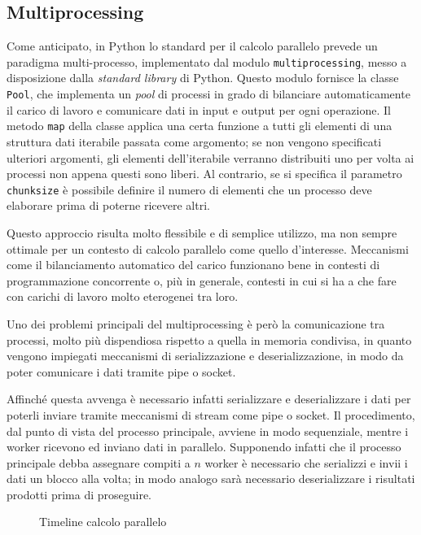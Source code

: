 \subsection{Multiprocessing}\label{ssec: parallel_mp}

Come anticipato, in Python lo standard per il calcolo parallelo prevede un
paradigma multi-processo, implementato dal modulo \verb|multiprocessing|, messo
a disposizione dalla \textit{standard library} di Python. Questo modulo fornisce
la classe \verb|Pool|, che implementa un \textit{pool} di processi in grado di
bilanciare automaticamente il carico di lavoro e comunicare dati in input e
output per ogni operazione. Il metodo \verb|map| della classe applica una certa
funzione a tutti gli elementi di una struttura dati iterabile passata come
argomento; se non vengono specificati ulteriori argomenti, gli elementi
dell'iterabile verranno distribuiti uno per volta ai processi non appena questi
sono liberi. Al contrario, se si specifica il parametro \verb|chunksize| è
possibile definire il numero di elementi che un processo deve elaborare prima
di poterne ricevere altri.

Questo approccio risulta molto flessibile e di semplice utilizzo, ma non sempre
ottimale per un contesto di calcolo parallelo come quello d'interesse.
Meccanismi come il bilanciamento automatico del carico funzionano bene in
contesti di programmazione concorrente o, più in generale, contesti in cui si
ha a che fare con carichi di lavoro molto eterogenei tra loro.

Uno dei problemi principali del multiprocessing è però la comunicazione tra
processi, molto più dispendiosa rispetto a quella in memoria condivisa, in
quanto vengono impiegati meccanismi di serializzazione e deserializzazione, in
modo da poter comunicare i dati tramite pipe o socket.

Affinché questa avvenga è necessario infatti serializzare e deserializzare i
dati per poterli inviare tramite meccanismi di stream come pipe o socket. Il
procedimento, dal punto di vista del processo principale, avviene in modo
sequenziale, mentre i worker ricevono ed inviano dati in parallelo. Supponendo
infatti che il processo principale debba assegnare compiti a $n$ worker è
necessario che serializzi e invii i dati un blocco alla volta; in modo analogo
sarà necessario deserializzare i risultati prodotti prima di proseguire.

\begin{figure}[H]
	\centering
	
	\caption{Timeline calcolo parallelo}
	\label{fig: timelineMP}
\end{figure}

